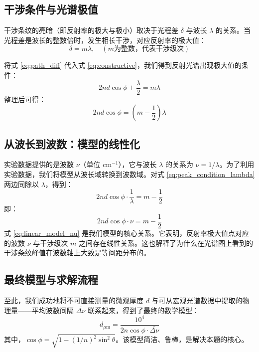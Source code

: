 \documentclass[withoutpreface,bwprint]{cumcmthesis} %
\begin{document}
\subsection{干涉条件与光谱极值}

干涉条纹的亮暗（即反射率的极大与极小）取决于光程差 $\delta$ 与波长 $\lambda$ 的关系。当光程差是波长的整数倍时，发生相长干涉，对应反射率的极大值：
\begin{equation}
    \delta = m\lambda, \quad (m \text{为整数，代表干涉级次})
    \label{eq:constructive}
\end{equation}

将式 \eqref{eq:path_diff} 代入式 \eqref{eq:constructive}，我们得到反射光谱出现极大值的条件：
\begin{equation}
    2nd\cos\phi + \frac{\lambda}{2} = m\lambda
\end{equation}
整理后可得：
\begin{equation}
    2nd\cos\phi = \left(m - \frac{1}{2}\right)\lambda
    \label{eq:peak_condition_lambda}
\end{equation}

\subsection{从波长到波数：模型的线性化}

实验数据提供的是波数 $\nu$（单位 cm$^{-1}$），它与波长 $\lambda$ 的关系为 $\nu = 1/\lambda$。为了利用实验数据，我们将模型从波长域转换到波数域。对式 \eqref{eq:peak_condition_lambda} 两边同除以 $\lambda$，得到：
\begin{equation}
    2nd\cos\phi \cdot \frac{1}{\lambda} = m - \frac{1}{2}
\end{equation}
即：
\begin{equation}
    2nd\cos\phi \cdot \nu = m - \frac{1}{2}
    \label{eq:linear_model_nu}
\end{equation}
式 \eqref{eq:linear_model_nu} 是我们模型的核心关系。它表明，反射率极大值点对应的波数 $\nu$ 与干涉级次 $m$ 之间存在线性关系。这也解释了为什么在光谱图上看到的干涉条纹峰值在波数轴上大致是等间距分布的。
\subsection{最终模型与求解流程}

至此，我们成功地将不可直接测量的微观厚度 $d$ 与可从宏观光谱数据中提取的物理量——平均波数间隔 $\overline{\Delta\nu}$ 联系起来，得到了最终的数学模型：
\begin{equation}
    \boxed{d_{\mu\text{m}} = \frac{10^4}{2n\cos\phi \cdot \overline{\Delta\nu}}}
    \label{eq:final_d_formula_um_final} %
\end{equation}
其中，$\cos\phi = \sqrt{1 - (1/n)^2 \sin^2\theta}$。该模型简洁、鲁棒，是解决本题的核心。
\end{document}
